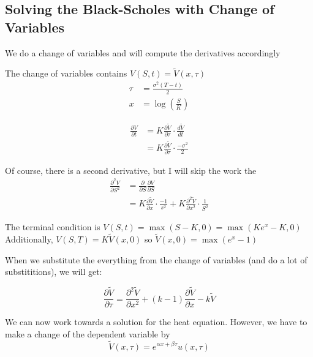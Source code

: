 \documentclass{article}
\begin{document}
\subsection*{Solving the Black-Scholes with Change of Variables}


We do a change of variables and will compute the derivatives accordingly



The change of variables contains $V(S,t) = \tilde{V}(x, \tau)$
\begin{align}
    \tau &= \frac{\sigma^2(T-t)}{2} \\
    x &= \log{(\frac{S}{K})}
\end{align}

\newcommand*{\tilv}{\tilde{V}} %


\begin{align*}
    \frac{\partial V}{\partial t} &= K\frac{\partial \tilde{V}}{\partial \tau}
    \cdot \frac{d\tilde{V}}{dt} \\
    &= K\frac{\partial \tilde{V}}{\partial \tau} \cdot \frac{-\sigma^2}{2}
\end{align*}

Of course, there is a second derivative, but I will skip the work the 
\begin{align*}
    \frac{\partial^2 V}{\partial S^2} &= \frac{\partial }{\partial S} \frac{\partial V}{\partial S} \\
    &= K \frac{\partial \tilde{V}}{\partial x} \cdot \frac{-1}{s^2} + K \frac{\partial^2 \tilde{V}}{\partial x^2} \cdot \frac{1}{S^2}
\end{align*}

The terminal condition is $V(S,t) = \max{(S-K, 0) = \max{(Ke^x - K, 0)}}$
Additionally, 
$V(S,T) = K\tilde{V}(x,0)$ so $\tilde{V}(x,0) = \max{(e^x -1)}$

When we substitute the everything from the change of variables (and do a lot of substititions), we will get:

\begin{equation}
    \frac{\partial \tilde{V}}{\partial \tau} = \frac{\partial^2 \tilde{V}}{\partial x^2} + (k-1)\frac{\partial \tilde{V}}{\partial x} - k\tilde{V}
\end{equation}

We can now work towards a solution for the heat equation. However, we have to make a change of the dependent variable by
\begin{equation}
    \tilde{V}(x, \tau) = e^{\alpha x + \beta \tau} u(x,\tau)
\end{equation}
\end{document}
